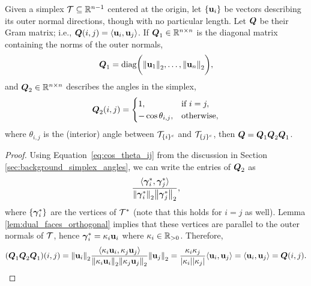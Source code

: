 \begin{lemma}
	Given a simplex $\mathcal{T}\subseteq\mathbb{R}^{n-1}$ centered at the origin, let $\{\vb{u}_i\}$ be vectors describing its outer normal directions, though with no particular length. Let $\vb*{Q}$ be their Gram matrix; i.e., $\vb*{Q}(i,j)=\langle \vb{u}_i,\vb{u}_j\rangle$. If $\vb*{Q}_1\in\mathbb{R}^{n\times n}$ is the diagonal matrix containing the norms of the outer normals, 
	\begin{equation*}
	\vb*{Q}_1 = \text{diag}\bigg(\norm{\vb{u}_1}_2,\dots,\norm{\vb{u}_n}_2\bigg),
	\end{equation*}
	and $\vb*{Q}_2\in\mathbb{R}^{n\times n}$ describes the angles in the simplex, 
	\begin{equation*}
	\vb*{Q}_2(i,j) = \begin{cases}
	1,& \text{if } i=j,\\
	-\cos\theta_{i,j},&\text{otherwise},
	\end{cases} 
	\end{equation*}
	where $\theta_{i,j}$ is the (interior) angle between $\mathcal{T}_{\{i\}^c}$ and $\mathcal{T}_{\{j\}^c}$, then $
	\vb*{Q} = \vb*{Q}_1 \vb*{Q}_2 \vb*{Q}_1$. 
\end{lemma}
\begin{proof}
	Using Equation~\eqref{eq:cos_theta_ij} from the discussion in Section \ref{sec:background_simplex_angles}, we can write the entries of $\vb*{Q}_2$ as 
	\[\frac{\langle \vb*{\gamma}^*_i,\vb*{\gamma}^*_j\rangle}{\norm{\vb*{\gamma}^*_i}_2\norm{\vb*{\gamma}^*_j}_2},\]
	where $\{\vb*{\gamma}^*_i\}$ are the vertices of $\mathcal{T}^*$ (note that this holds for $i=j$ as well). Lemma \ref{lem:dual_faces_orthogonal} implies that these vertices are parallel to the outer normals of $\mathcal{T}$, hence  $\vb*{\gamma}^*_i = \kappa_i \vb{u}_i$ where $\kappa_i\in \mathbb{R}_{> 0}$. Therefore, 
	\begin{equation*}
	(\vb*{Q}_1\vb*{Q}_2\vb*{Q}_1)(i,j) = \norm{\vb{u}_i}_2 \frac{\langle \kappa_i\vb{u}_i,\kappa_j\vb{u}_j\rangle}{\norm{\kappa_i\vb{u}_i}_2\norm{\kappa_j\vb{u}_j}_2}\norm{\vb{u}_j}_2 = \frac{\kappa_i\kappa_j}{|\kappa_i||\kappa_j|}\langle \vb{u}_i,\vb{u}_j\rangle = \langle \vb{u}_i,\vb{u}_j\rangle=\vb*{Q}(i,j).\qedhere
	\end{equation*}
\end{proof}

